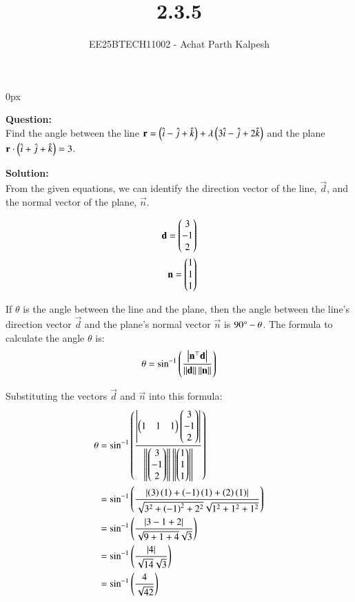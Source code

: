 \documentclass[journal]{IEEEtran}
\begin{document}

\title{2.3.5}
\author{EE25BTECH11002 - Achat Parth Kalpesh }
{\let\newpage\relax\maketitle}
\renewcommand{\thefigure}{\theenumi}
\renewcommand{\thetable}{\theenumi}
\setlength{\intextsep}{10pt} %
\renewcommand{\thetable}{\theenumi}
\parindent 0px

\textbf{Question:}\\
Find the angle between the line $\mathbf{r} = \left(\hat{i} - \hat{j} + \hat{k}\right) + \lambda\left(3\hat{i} - \hat{j} + 2\hat{k}\right)$ and the plane $\mathbf{r} \cdot \left(\hat{i} + \hat{j} + \hat{k}\right) = 3$.

\textbf{Solution:}\\
From the given equations, we can identify the direction vector of the line,
$\vec{d}$, and the normal vector of the plane, $\vec{n}$.

\begin{align} 
\label{eq:d_vec}
\mathbf{d} = \begin{pmatrix}3\\-1\\2\end{pmatrix} \\
\label{eq:n_vec}
\mathbf{n} = \begin{pmatrix}1\\1\\1\end{pmatrix}
\end{align}


If $\theta$ is the angle between the line and the plane, then the angle between the line's direction vector $\vec{d}$ and the plane's normal vector $\vec{n}$ is $90\degree - \theta$. The formula to calculate the angle $\theta$ is:
\begin{align}
\theta = \sin^{-1}\left(\frac{\left\vert\mathbf{n}^\top\mathbf{d}\right\vert}{\left\lVert\mathbf{d}\right\rVert \left\lVert\mathbf{n}\right\rVert}\right)
\end{align}

Substituting the vectors $\vec{d}$ and $\vec{n}$ into this formula:
\begin{align}
\theta &= \sin^{-1}\left(\frac{\left\vert\begin{pmatrix}1&1&1\end{pmatrix}\begin{pmatrix}3\\-1\\2\end{pmatrix}\right\vert}{\left\lVert\begin{pmatrix}3\\-1\\2\end{pmatrix}\right\rVert\left\lVert\begin{pmatrix}1\\1\\1\end{pmatrix}\right\rVert}\right) \\
&= \sin^{-1} \left(\frac{\left\vert\left(3\right)\left(1\right) + \left(-1\right)\left(1\right) + \left(2\right)\left(1\right)\right\vert}{\sqrt{3^2 + \left(-1\right)^2 + 2^2}\sqrt{1^2 + 1^2 + 1^2}}\right) \\
&= \sin^{-1}\left(\frac{\left\vert3-1+2\right\vert}{\sqrt{9+1+4}\sqrt{3}}\right) \\
&= \sin^{-1}\left(\frac{\left\vert4\right\vert}{\sqrt{14}\sqrt{3}}\right) \\
&= \sin^{-1}\left(\frac{4}{\sqrt{42}}\right)
\end{align}
\end{document}
